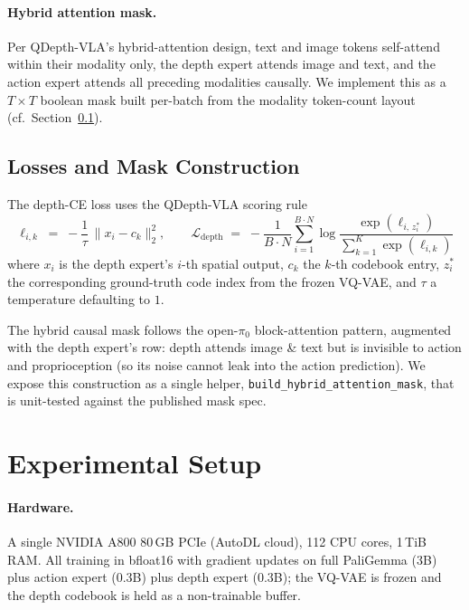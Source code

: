\documentclass{article}
\newcommand{\Ldepth}{\mathcal{L}_{\mathrm{depth}}}
\begin{document}
\paragraph{Hybrid attention mask.} Per QDepth-VLA's hybrid-attention design, text and image tokens self-attend within their modality only, the depth expert attends image and text, and the action expert attends all preceding modalities causally. We implement this as a $T\!\times\!T$ boolean mask built per-batch from the modality token-count layout (cf.\ Section~\ref{sec:method:loss}).

\subsection{Losses and Mask Construction}\label{sec:method:loss}

The depth-CE loss uses the QDepth-VLA scoring rule
\begin{equation}
  \ell_{i,k} \;=\; -\frac{1}{\tau}\,\| x_i - c_k \|_2^2, \qquad
  \Ldepth \;=\; -\frac{1}{B \cdot N} \sum_{i=1}^{B \cdot N} \log \frac{\exp(\ell_{i,\,z_i^*})}{\sum_{k=1}^{K} \exp(\ell_{i,k})}
\end{equation}
where $x_i$ is the depth expert's $i$-th spatial output, $c_k$ the $k$-th codebook entry, $z_i^*$ the corresponding ground-truth code index from the frozen VQ-VAE, and $\tau$ a temperature defaulting to $1$.

The hybrid causal mask follows the open-$\pi_0$ block-attention pattern, augmented with the depth expert's row: depth attends image \& text but is invisible to action and proprioception (so its noise cannot leak into the action prediction). We expose this construction as a single helper, \texttt{build\_hybrid\_attention\_mask}, that is unit-tested against the published mask spec.

\section{Experimental Setup}\label{sec:setup}

\paragraph{Hardware.} A single NVIDIA A800 80\,GB PCIe (AutoDL cloud), 112 CPU cores, 1\,TiB RAM. All training in bfloat16 with gradient updates on full PaliGemma (3B) plus action expert (0.3B) plus depth expert (0.3B); the VQ-VAE is frozen and the depth codebook is held as a non-trainable buffer.
\end{document}
